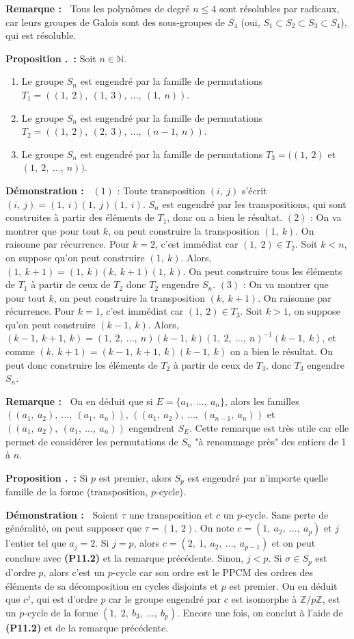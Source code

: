 \documentclass[5pt,a4paper]{article}
\newcounter{propcounter}[subsection]
\renewcommand{\thepropcounter}{\thesubsection.\arabic{propcounter}}
\newcommand{\prop}[1]{
    \stepcounter{propcounter}
    \hypertarget{p:\thepropcounter}{}%
    \noindent\textbf{Proposition \thepropcounter ~:} #1 \newline
}
\newcommand{\propEnum}[1]{
    \stepcounter{propcounter}
    \hypertarget{p:\thepropcounter}{}%
    \noindent\textbf{Proposition \thepropcounter ~:} #1
}
\newcommand{\demo}[1]{
    \textbf{Démonstration :~} #1 \newline
}
\newcommand{\rmq}[1]{
    \textbf{Remarque :~} #1 \newline
}
\begin{document}
\begin{onehalfspacing}
\rmq{Tous les polynômes de degré $n \leq 4$ sont résolubles par radicaux, car leurs groupes de Galois sont des sous-groupes de $S_4$ (oui, $S_1 \subset S_2 \subset S_3 \subset S_4$), qui est résoluble.}


\propEnum{Soit $n \in \mathbb{N}$. 
	\begin{enumerate}
	\item Le groupe $S_n$ est engendré par la famille de permutations $T_1 = ((1,~2),~(1,~3),~...,~(1,~n))$.
	\item Le groupe $S_n$ est engendré par la famille de permutations $T_2 = ((1,~2),~(2,~3),~...,~(n-1,~n))$.
	\item Le groupe $S_n$ est engendré par la famille de permutations $T_3 = ((1,~2)$ et $(1,~2,~...,~n))$.
	\end{enumerate}
}
\demo{$(1)$ : Toute transposition $(i,~j)$ s'écrit $(i,~j) = (1,~i)(1,~j)(1,~i)$. $S_n$ est engendré par les transpositions, qui sont construites à partir des éléments de $T_1$, donc on a bien le résultat. $(2)$ : On va montrer que pour tout $k$, on peut construire la transposition $(1,~k)$. On raisonne par récurrence. Pour $k = 2$, c'est immédiat car $(1,~2) \in T_2$. Soit $k < n$, on suppose qu'on peut construire $(1,~k)$. Alors, $(1,~k+1) = (1,~k)(k,~k+1)(1,~k)$. On peut construire tous les éléments de $T_1$ à partir de ceux de $T_2$ donc $T_2$ engendre $S_n$. $(3)$ : On va montrer que pour tout $k$, on peut construire la transposition $(k,~k+1)$. On raisonne par récurrence. Pour $k = 1$, c'est immédiat car $(1,~2) \in T_3$. Soit $k > 1$, on suppose qu'on peut construire $(k-1,~k)$. Alors, $(k-1,~k+1,~k) = (1,~2,~...,~n)(k-1,~k)(1,~2,~...,~n)^{-1}(k-1,~k)$, et comme $(k,~k+1) = (k-1,~k+1,~k)(k-1,~k)$ on a bien le résultat. On peut donc construire les éléments de $T_2$ à partir de ceux de $T_3$, donc $T_3$ engendre $S_n$.}

\rmq{On en déduit que si $E = \{a_1,~...,~a_n\}$, alors les familles $((a_1,~a_2),~...,~(a_1,~a_n))$, $((a_1,~a_2),~...,~(a_{n-1},~a_n))$ et $((a_1,~a_2),~(a_1,~...,~a_n))$ engendrent $S_E$. Cette remarque est très utile car elle permet de considérer les permutations de $S_n$ "à renommage près" des entiers de 1 à $n$.}


\prop{Si $p$ est premier, alors $S_p$ est engendré par n'importe quelle famille de la forme (transposition, $p$-cycle).}
\demo{Soient $\tau$ une transposition et $c$ un $p$-cycle. Sans perte de généralité, on peut supposer que $\tau = (1,~2)$. On note $c = (1,~a_2,~...,~a_p)$ et $j$ l'entier tel que $a_j = 2$. Si $j = p$, alors $c = (2,~1,~a_2,~...,~a_{p-1})$ et on peut conclure avec \textbf{(P11.2)} et la remarque précédente. Sinon, $j < p$. Si $\sigma \in S_p$ est d'ordre $p$, alors c'est un $p$-cycle car son ordre est le PPCM des ordres des éléments de sa décomposition en cycles disjoints et $p$ est premier. On en déduit que $c^j$, qui est d'ordre $p$ car le groupe engendré par $c$ est isomorphe à $\mathbb{Z}/p\mathbb{Z}$, est un $p$-cycle de la forme $(1,~2,~b_3,~...,~b_p)$. Encore une fois, on conclut à l'aide de \textbf{(P11.2)} et de la remarque précédente.}



\end{onehalfspacing}
\end{document}
